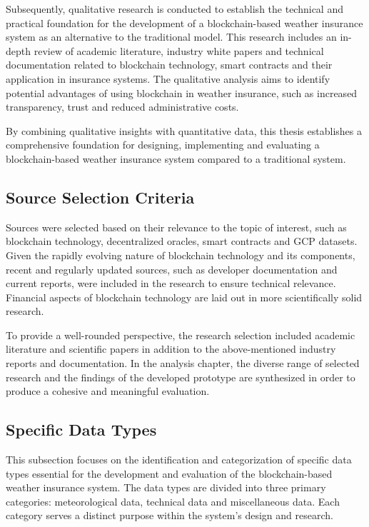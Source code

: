 Subsequently, qualitative research is conducted to establish the technical and practical foundation for the development of a blockchain-based weather insurance system as an alternative to the traditional model. This research includes an in-depth review of academic literature, industry white papers and technical documentation related to blockchain technology, smart contracts and their application in insurance systems. The qualitative analysis aims to identify potential advantages of using blockchain in weather insurance, such as increased transparency, trust and reduced administrative costs.

By combining qualitative insights with quantitative data, this thesis establishes a comprehensive foundation for designing, implementing and evaluating a blockchain-based weather insurance system compared to a traditional system.

\subsection{Source Selection Criteria}
Sources were selected based on their relevance to the topic of interest, such as blockchain technology, decentralized oracles, smart contracts and GCP datasets. Given the rapidly evolving nature of blockchain technology and its components, recent and regularly updated sources, such as developer documentation and current reports, were included in the research to ensure technical relevance. Financial aspects of blockchain technology are laid out in more scientifically solid research.

To provide a well-rounded perspective, the research selection included academic literature and scientific papers in addition to the above-mentioned industry reports and documentation. In the analysis chapter, the diverse range of selected research and the findings of the developed prototype are synthesized in order to produce a cohesive and meaningful evaluation.

\subsection{Specific Data Types}
This subsection focuses on the identification and categorization of specific data types essential for the development and evaluation of the blockchain-based weather insurance system. The data types are divided into three primary categories: meteorological data, technical data and miscellaneous data. Each category serves a distinct purpose within the system's design and research.

